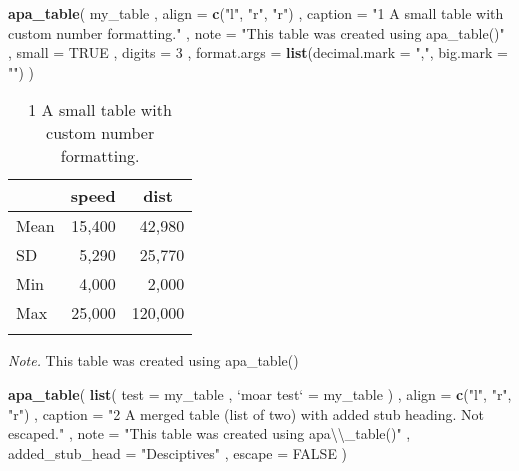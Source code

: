 \documentclass[man]{apa6}
\newenvironment{Shaded}{\begin{snugshade}}{\end{snugshade}}
\newcommand{\KeywordTok}[1]{\textcolor[rgb]{0.13,0.29,0.53}{\textbf{#1}}}
\newcommand{\DataTypeTok}[1]{\textcolor[rgb]{0.13,0.29,0.53}{#1}}
\newcommand{\DecValTok}[1]{\textcolor[rgb]{0.00,0.00,0.81}{#1}}
\newcommand{\CharTok}[1]{\textcolor[rgb]{0.31,0.60,0.02}{#1}}
\newcommand{\StringTok}[1]{\textcolor[rgb]{0.31,0.60,0.02}{#1}}
\newcommand{\OtherTok}[1]{\textcolor[rgb]{0.56,0.35,0.01}{#1}}
\newcommand{\NormalTok}[1]{#1}
\begin{document}
\begin{Shaded}
\begin{Highlighting}[]
\KeywordTok{apa_table}\NormalTok{(}
\NormalTok{  my_table}
\NormalTok{  , }\DataTypeTok{align =} \KeywordTok{c}\NormalTok{(}\StringTok{"l"}\NormalTok{, }\StringTok{"r"}\NormalTok{, }\StringTok{"r"}\NormalTok{)}
\NormalTok{  , }\DataTypeTok{caption =} \StringTok{"1 A small table with custom number formatting."}
\NormalTok{  , }\DataTypeTok{note =} \StringTok{"This table was created using apa_table()"}
\NormalTok{  , }\DataTypeTok{small =} \OtherTok{TRUE}
\NormalTok{  , }\DataTypeTok{digits =} \DecValTok{3}
\NormalTok{  , }\DataTypeTok{format.args =} \KeywordTok{list}\NormalTok{(}\DataTypeTok{decimal.mark =} \StringTok{","}\NormalTok{, }\DataTypeTok{big.mark =} \StringTok{""}\NormalTok{)}
\NormalTok{)}
\end{Highlighting}
\end{Shaded}

\begin{table}[tbp]
\begin{center}
\begin{threeparttable}
\caption{\label{tab:unnamed-chunk-2}1 A small table with custom number formatting.}
\small{
\begin{tabular}{lrr}
\toprule
 & \multicolumn{1}{c}{speed} & \multicolumn{1}{c}{dist}\\
\midrule
Mean & 15,400 & 42,980\\
SD & 5,290 & 25,770\\
Min & 4,000 & 2,000\\
Max & 25,000 & 120,000\\
\bottomrule
\addlinespace
\end{tabular}
}
\begin{tablenotes}[para]
\textit{Note.} This table was created using apa\_table()
\end{tablenotes}
\end{threeparttable}
\end{center}
\end{table}

\begin{Shaded}
\begin{Highlighting}[]
\KeywordTok{apa_table}\NormalTok{(}
  \KeywordTok{list}\NormalTok{(}
    \DataTypeTok{test =}\NormalTok{ my_table}
\NormalTok{    , }\StringTok{`}\DataTypeTok{moar test}\StringTok{`}\NormalTok{ =}\StringTok{ }\NormalTok{my_table}
\NormalTok{  )}
\NormalTok{  , }\DataTypeTok{align =} \KeywordTok{c}\NormalTok{(}\StringTok{"l"}\NormalTok{, }\StringTok{"r"}\NormalTok{, }\StringTok{"r"}\NormalTok{)}
\NormalTok{  , }\DataTypeTok{caption =} \StringTok{"2 A merged table (list of two) with added stub heading. Not escaped."}
\NormalTok{  , }\DataTypeTok{note =} \StringTok{"This table was created using apa}\CharTok{\textbackslash{}\textbackslash{}}\StringTok{_table()"}
\NormalTok{  , }\DataTypeTok{added_stub_head =} \StringTok{"Desciptives"}
\NormalTok{  , }\DataTypeTok{escape =} \OtherTok{FALSE}
\NormalTok{)}
\end{Highlighting}
\end{Shaded}
\end{document}
